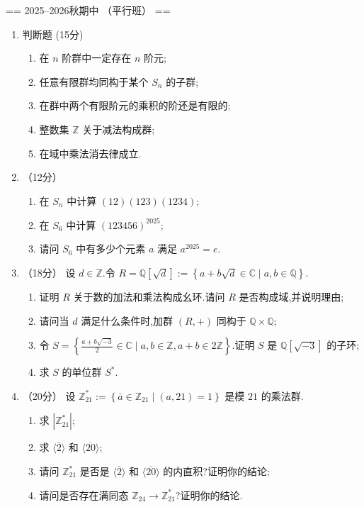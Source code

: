 == 2025--2026秋期中 （平行班） ==
\begin{enumerate}
\item 判断题 (15分)
\begin{enumerate}
    \item 在 $n$ 阶群中一定存在 $n$ 阶元;
    \item 任意有限群均同构于某个 $S_n$ 的子群;
    \item 在群中两个有限阶元的乘积的阶还是有限的;
    \item 整数集 $\mathbb{Z}$ 关于减法构成群;
    \item 在域中乘法消去律成立.
\end{enumerate}

\item （12分）
\begin{enumerate}
    \item 在 $S_n$ 中计算 $(12)(123)(1234)$;
    \item 在 $S_6$ 中计算 $(123456)^{2025}$;
    \item 请问 $S_6$ 中有多少个元素 $a$ 满足 $a^{2025} = e$.
\end{enumerate}

\item （18分）
设 $d \in \mathbb{Z}$.令 $R = \mathbb{Q}[\sqrt{d}] := \left\{a + b \sqrt{d} \in \mathbb{C} \mid a,b \in \mathbb{Q}\right\}$.
\begin{enumerate}
    \item 证明 $R$ 关于数的加法和乘法构成幺环.请问 $R$ 是否构成域,并说明理由;
    \item 请问当 $d$ 满足什么条件时,加群 $(R,+)$ 同构于 $\mathbb{Q} \times \mathbb{Q}$;
    \item 令 $S = \left\{\frac{a+b\sqrt{-3}}{2} \in \mathbb{C} \mid a,b \in \mathbb{Z}, a+b \in 2\mathbb{Z}\right\}$.证明 $S$ 是 $\mathbb{Q}[\sqrt{-3}]$ 的子环;
    \item 求 $S$ 的单位群 $S^*$.
\end{enumerate}

\item （20分）
设 $\mathbb{Z}_{21}^{*} := \left\{\bar{a} \in \mathbb{Z}_{21} \mid (a,21)=1\right\}$ 是模 $21$ 的乘法群.
\begin{enumerate}
    \item 求 $|\mathbb{Z}_{21}^{*}|$;
    \item 求 $\langle \bar{2} \rangle$ 和 $\langle \overline{20} \rangle$;
    \item 请问 $\mathbb{Z}_{21}^{*}$ 是否是 $\langle \bar{2} \rangle$ 和 $\langle \overline{20} \rangle$ 的内直积?证明你的结论;
    \item 请问是否存在满同态 $\mathbb{Z}_{24} \to \mathbb{Z}_{21}^{*}$?证明你的结论.
\end{enumerate}


\end{enumerate}
